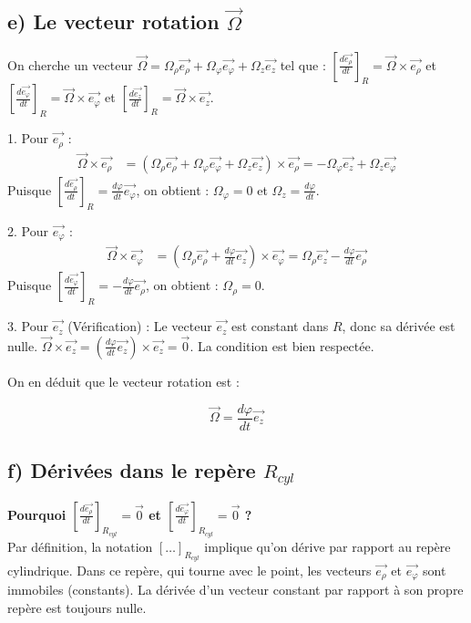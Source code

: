 \documentclass[11pt,a4paper]{article}
\begin{document}
\subsection*{e) Le vecteur rotation $\vec{\Omega}$}
On cherche un vecteur $\vec{\Omega} = \Omega_\rho \vec{e_\rho} + \Omega_\varphi \vec{e_\varphi} + \Omega_z \vec{e_z}$ tel que :
$\left[\frac{d\vec{e_\rho}}{dt}\right]_R = \vec{\Omega} \times \vec{e_\rho}$ \quad et \quad $\left[\frac{d\vec{e_\varphi}}{dt}\right]_R = \vec{\Omega} \times \vec{e_\varphi}$ \quad et \quad $\left[\frac{d\vec{e_z}}{dt}\right]_R = \vec{\Omega} \times \vec{e_z}$.

1. Pour $\vec{e_\rho}$ :
\begin{align*}
\vec{\Omega} \times \vec{e_\rho} &= (\Omega_\rho \vec{e_\rho} + \Omega_\varphi \vec{e_\varphi} + \Omega_z \vec{e_z}) \times \vec{e_\rho} = -\Omega_\varphi \vec{e_z} + \Omega_z \vec{e_\varphi}
\end{align*}
Puisque $\left[\frac{d\vec{e_\rho}}{dt}\right]_R = \frac{d\varphi}{dt} \vec{e_\varphi}$, on obtient : $\Omega_\varphi = 0$ et $\Omega_z = \frac{d\varphi}{dt}$.

2. Pour $\vec{e_\varphi}$ :
\begin{align*}
\vec{\Omega} \times \vec{e_\varphi} &= \left(\Omega_\rho \vec{e_\rho} + \frac{d\varphi}{dt} \vec{e_z}\right) \times \vec{e_\varphi} = \Omega_\rho \vec{e_z} - \frac{d\varphi}{dt} \vec{e_\rho}
\end{align*}
Puisque $\left[\frac{d\vec{e_\varphi}}{dt}\right]_R = -\frac{d\varphi}{dt} \vec{e_\rho}$, on obtient : $\Omega_\rho = 0$.

3. Pour $\vec{e_z}$ (Vérification) :
Le vecteur $\vec{e_z}$ est constant dans $R$, donc sa dérivée est nulle.
$\vec{\Omega} \times \vec{e_z} = \left(\frac{d\varphi}{dt} \vec{e_z}\right) \times \vec{e_z} = \vec{0}$. La condition est bien respectée.

On en déduit que le vecteur rotation est :
\begin{sonucbox}
$$ \vec{\Omega} = \frac{d\varphi}{dt} \vec{e_z} $$
\end{sonucbox}

\subsection*{f) Dérivées dans le repère $R_{cyl}$}
\textbf{Pourquoi $\left[\frac{d\vec{e_\rho}}{dt}\right]_{R_{cyl}} = \vec{0}$ et $\left[\frac{d\vec{e_\varphi}}{dt}\right]_{R_{cyl}} = \vec{0}$ ?} \\
Par définition, la notation $\left[\dots\right]_{R_{cyl}}$ implique qu'on dérive par rapport au repère cylindrique. Dans ce repère, qui tourne avec le point, les vecteurs $\vec{e_\rho}$ et $\vec{e_\varphi}$ sont immobiles (constants). La dérivée d'un vecteur constant par rapport à son propre repère est toujours nulle.
\end{document}
